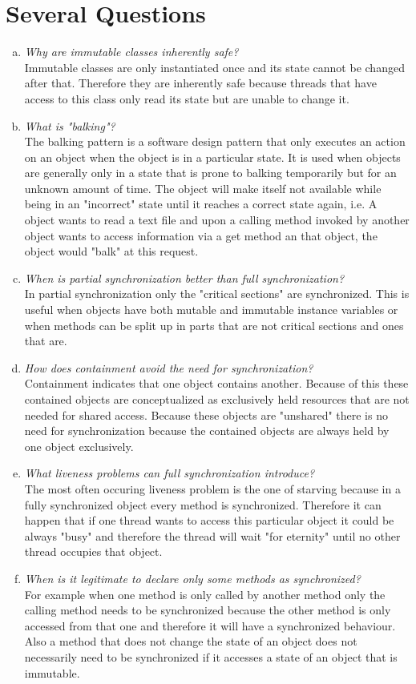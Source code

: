 \documentclass{report}
\author{Marcel \textsc{Zauder} 16-124-836 \\
	Pascal \textsc{Gerig} 16-104-721}
\begin{document}
	\section{Several Questions}
	\startsection
		\begin{enumerate}[a)]
			\item \textit{Why are immutable classes inherently safe?} \\
			Immutable classes are only instantiated once and its state cannot be changed after that. Therefore they are inherently safe because threads that have access to this class only read its state but are unable to change it.
			\item \textit{What is "balking"?} \\
			The balking pattern is a software design pattern that only executes an action on an object when the object is in a particular state. It is used when objects are generally only in a state that is prone to balking temporarily but for an unknown amount of time. The object will make itself not available while being in an "incorrect" state until it reaches a correct state again, i.e. A object wants to read a text file and upon a calling method invoked by another object wants to access information via a get method an that object, the object would "balk" at this request.
			\item \textit{When is partial synchronization better than full synchronization?} \\
			In partial synchronization only the "critical sections" are synchronized. This is useful when objects have both mutable and immutable instance variables or when methods can be split up in parts that are not critical sections and ones that are.
			\item \textit{How does containment avoid the need for synchronization?} \\
			Containment indicates that one object contains another. Because of this these contained objects are conceptualized as exclusively held resources that are not needed for shared access. Because these objects are "unshared" there is no need for synchronization because the contained objects are always held by one object exclusively.
			\item \textit{What liveness problems can full synchronization introduce?} \\
			The most often occuring liveness problem is the one of starving because in a fully synchronized object every method is synchronized. Therefore it can happen that if one thread wants to access this particular object it could be always "busy" and therefore the thread will wait "for eternity" until no other thread occupies that object.
			\item \textit{When is it legitimate to declare only some methods as synchronized?} \\
			For example when one method is only called by another method only the calling method needs to be synchronized because the other method is only accessed from that one and therefore it will have a synchronized behaviour. Also a method that does not change the state of an object does not necessarily need to be synchronized if it accesses a state of an object that is immutable.
		\end{enumerate}
	\closesection
	
\end{document}
